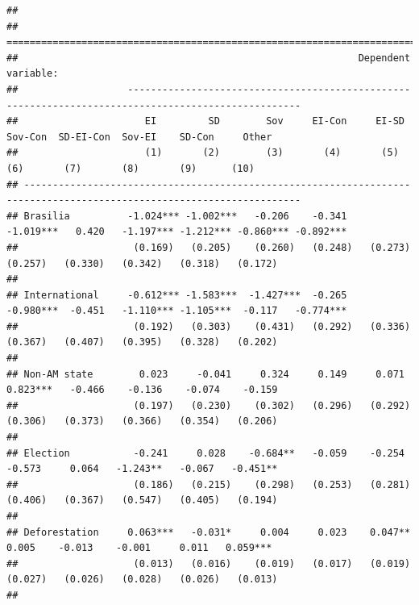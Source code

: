 \documentclass[]{interact}
\theoremstyle{plain}%
\theoremstyle{definition}
\theoremstyle{remark}
\begin{document}
\begin{verbatim}
## 
## ======================================================================================================================
##                                                           Dependent variable:                                         
##                   ----------------------------------------------------------------------------------------------------
##                      EI         SD        Sov     EI-Con     EI-SD    Sov-Con  SD-EI-Con  Sov-EI    SD-Con     Other  
##                      (1)       (2)        (3)       (4)       (5)       (6)       (7)       (8)       (9)      (10)   
## ----------------------------------------------------------------------------------------------------------------------
## Brasilia          -1.024*** -1.002***   -0.206    -0.341   -1.019***   0.420   -1.197*** -1.212*** -0.860*** -0.892***
##                    (0.169)   (0.205)    (0.260)   (0.248)   (0.273)   (0.257)   (0.330)   (0.342)   (0.318)   (0.172) 
##                                                                                                                       
## International     -0.612*** -1.583***  -1.427***  -0.265   -0.980***  -0.451   -1.110*** -1.105***  -0.117   -0.774***
##                    (0.192)   (0.303)    (0.431)   (0.292)   (0.336)   (0.367)   (0.407)   (0.395)   (0.328)   (0.202) 
##                                                                                                                       
## Non-AM state        0.023     -0.041     0.324     0.149     0.071   0.823***   -0.466    -0.136    -0.074    -0.159  
##                    (0.197)   (0.230)    (0.302)   (0.296)   (0.292)   (0.306)   (0.373)   (0.366)   (0.354)   (0.206) 
##                                                                                                                       
## Election           -0.241     0.028    -0.684**   -0.059    -0.254    -0.573     0.064   -1.243**   -0.067   -0.451** 
##                    (0.186)   (0.215)    (0.298)   (0.253)   (0.281)   (0.406)   (0.367)   (0.547)   (0.405)   (0.194) 
##                                                                                                                       
## Deforestation     0.063***   -0.031*     0.004     0.023    0.047**    0.005    -0.013    -0.001     0.011   0.059*** 
##                    (0.013)   (0.016)    (0.019)   (0.017)   (0.019)   (0.027)   (0.026)   (0.028)   (0.026)   (0.013) 
##                                                                                                                       

\end{verbatim}
\end{document}
